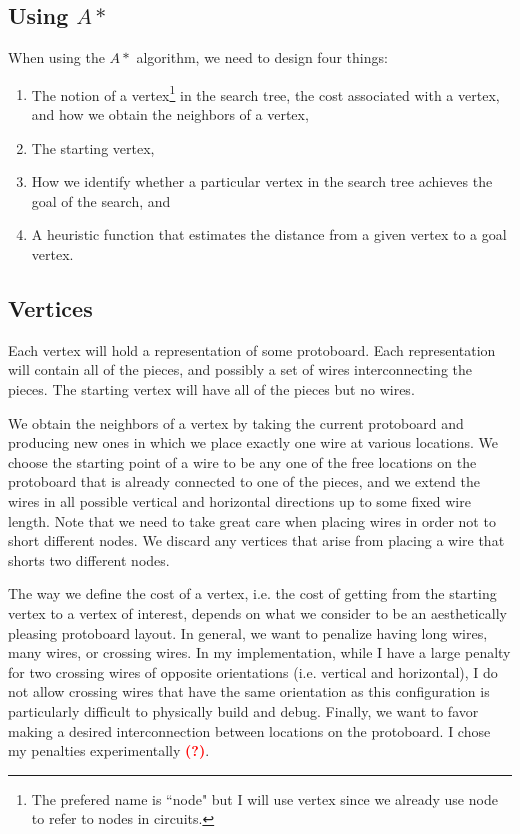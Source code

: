 \subsection{Using $A*$}

When using the $A*$ algorithm, we need to design four things:

\begin{enumerate}
\item The notion of a vertex\footnote{The prefered name is ``node" but I will
use vertex since we already use node to refer to nodes in circuits.} in the
search tree, the cost associated with a vertex, and how we obtain the neighbors
of a vertex,
\item The starting vertex,
\item How we identify whether a particular vertex in the search tree achieves
the goal of the search, and
\item A heuristic function that estimates the distance from a given vertex to a
goal vertex.
\end{enumerate}

\subsection{Vertices}

Each vertex will hold a representation of some protoboard. Each representation
will contain all of the pieces, and possibly a set of wires interconnecting the
pieces. The starting vertex will have all of the pieces but no wires.

We obtain the neighbors of a vertex by taking the current protoboard and
producing new ones in which we place exactly one wire at various locations. We
choose the starting point of a wire to be any one of the free locations on the
protoboard that is already connected to one of the pieces, and we extend the
wires in all possible vertical and horizontal directions up to some fixed wire
length. Note that we need
to take great care when placing wires in order not to short different nodes. We
discard any vertices that arise from placing a wire that shorts two different
nodes.

The way we define the cost of a vertex, i.e. the cost of getting from the
starting vertex to a vertex of interest, depends on what we consider to be an
aesthetically pleasing protoboard layout. In general, we want to penalize having
long wires, many wires, or crossing wires. In my implementation, while I have
a large penalty for two crossing wires of opposite orientations (i.e. vertical
and horizontal), I do not allow crossing wires that have the same orientation as
this configuration is particularly difficult to physically build and debug.
Finally, we want to favor making a desired interconnection between locations
on the protoboard. I chose my penalties experimentally
\textcolor{red}{\textbf{(?)}}.

